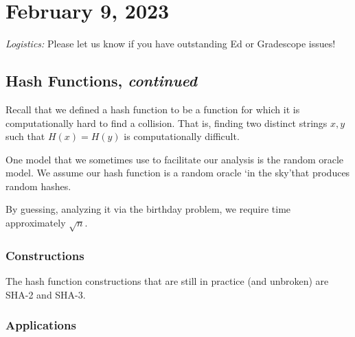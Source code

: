 \section{February 9, 2023}
\label{20230209}

\emph{Logistics:} Please let us know if you have outstanding Ed or Gradescope issues!

\subsection{Hash Functions, \emph{continued}}
Recall that we defined a hash function to be a function for which it is computationally hard to find a collision. That is, finding two distinct strings $x, y$ such that $H(x) = H(y)$ is computationally difficult.


One model that we sometimes use to facilitate our analysis is the random oracle model. We assume our hash function is a random oracle `in the sky'that produces random hashes.

By guessing, analyzing it via the birthday problem, we require time approximately $\sqrt{n}$.


\subsubsection{Constructions}

The hash function constructions that are still in practice (and unbroken) are SHA-2 and SHA-3.

\subsubsection{Applications}

